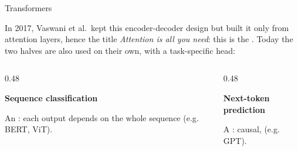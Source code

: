 \begin{frame}{Transformers}
    \setlength{\parskip}{4pt}

    In 2017, Vaswani et al.\ kept this encoder-decoder design but built it only
    from attention layers, hence the title \textit{Attention is all you need}:
    this is the . Today the two halves are also used on
    their own, with a task-specific head:

    \vspace{0.2em}
    \begin{columns}[T,onlytextwidth]
        \begin{column}{0.48\textwidth}
            \begin{tcolorbox}[nndsblue,courseheight={families}{}]
                \textbf{Sequence classification}\par
                An : each output depends on the whole
                sequence (e.g. BERT, ViT).
            \end{tcolorbox}
        \end{column}
        \begin{column}{0.48\textwidth}
            \begin{tcolorbox}[nndsred,courseheight={families}{}]
                \textbf{Next-token prediction}\par
                A : causal,  (e.g. GPT).
            \end{tcolorbox}
        \end{column}
    \end{columns}


\end{frame}

